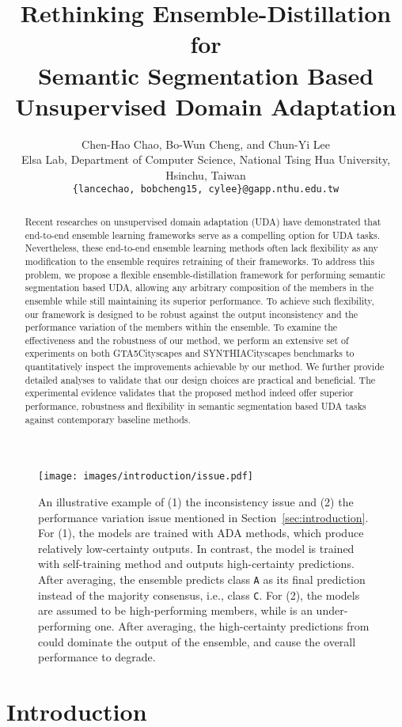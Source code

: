 \documentclass[final]{cvpr}
\begin{document}
\title{Rethinking Ensemble-Distillation for \\Semantic Segmentation Based Unsupervised Domain Adaptation}

\author{Chen-Hao Chao, Bo-Wun Cheng, and Chun-Yi Lee \\
Elsa Lab, Department of Computer Science, National Tsing Hua University, Hsinchu, Taiwan\\
{\tt\small \{lancechao, bobcheng15, cylee\}@gapp.nthu.edu.tw}
}

\maketitle

\begin{abstract}
Recent researches on unsupervised domain adaptation (UDA) have demonstrated that end-to-end ensemble learning frameworks serve as a compelling option for UDA tasks. Nevertheless, these end-to-end ensemble learning methods often lack flexibility as any modification to the ensemble requires retraining of their frameworks. To address this problem, we propose a flexible ensemble-distillation framework for performing semantic segmentation based UDA, allowing any arbitrary composition of the members in the ensemble while still maintaining its superior performance. To achieve such flexibility, our framework is designed to be robust against the output inconsistency and the performance variation of the members within the ensemble. To examine the effectiveness and the robustness of our method, we perform an extensive set of experiments on both GTA5Cityscapes and SYNTHIACityscapes benchmarks to quantitatively inspect the improvements achievable by our method. We further provide detailed analyses to validate that our design choices are practical and beneficial. The experimental evidence validates that the proposed method indeed offer superior performance, robustness and flexibility in semantic segmentation based UDA tasks against contemporary baseline methods.
\end{abstract}
 \vspace{-1.5em}
\begin{figure}[t]
    \texttt{[image: images/introduction/issue.pdf]}
    \caption{An illustrative example of (1) the inconsistency issue and (2) the performance variation issue mentioned in Section~\ref{sec:introduction}. For (1), the models  are trained with ADA methods, which produce relatively low-certainty outputs. In contrast, the model  is trained with self-training method and outputs high-certainty predictions. After averaging, the ensemble predicts class \texttt{A} as its final prediction instead of the majority consensus, i.e., class \texttt{C}. For (2), the models  are assumed to be high-performing members, while  is an under-performing one. After averaging, the high-certainty predictions from  could dominate the output of the ensemble, and cause the overall performance to degrade.} 
    \label{fig:issue}
\end{figure} \section{Introduction}
\end{document}
